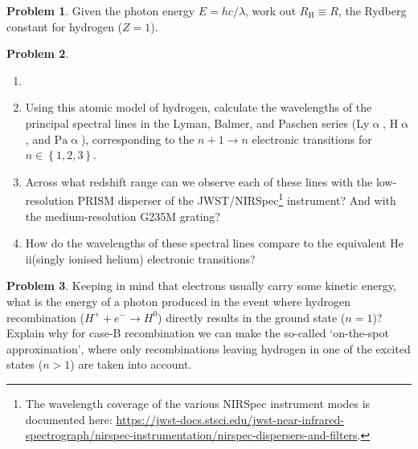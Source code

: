 \documentclass{article}
\newcommand{\Lya}{{Ly\ensuremath{\upalpha}}\xspace}
\newcommand{\HeII}{\hbox{He\,{\sc ii}}\xspace}
\newcommand{\Halpha}{\ensuremath{\mathrm{H}\upalpha}\xspace}
\newcommand{\Paalpha}{\ensuremath{\mathrm{Pa}\upalpha}\xspace}
\theoremstyle{definition}
\newtheorem{problem}{Problem}[section]
\begin{document}
\begin{problem}
    Given the photon energy $E = hc/\lambda$, work out $R_\mathrm{H} \equiv R$, the Rydberg constant for hydrogen ($Z = 1$).
\end{problem}
\begin{problem}
    \label{prob:HI_wavelengths}
    \begin{enumerate}[label=(\alph*)]
        \item[]
        \item Using this atomic model of hydrogen, calculate the wavelengths of the principal spectral lines in the Lyman, Balmer, and Paschen series (\Lya, \Halpha, and \Paalpha), corresponding to the $n+1 \rightarrow n$ electronic transitions for $n \in \left\{ 1, 2, 3 \right\}$.
        \item Across what redshift range can we observe each of these lines with the low-resolution PRISM disperser of the JWST/NIRSpec\footnote{The wavelength coverage of the various NIRSpec instrument modes is documented here: \url{https://jwst-docs.stsci.edu/jwst-near-infrared-spectrograph/nirspec-instrumentation/nirspec-dispersers-and-filters}.} instrument? And with the medium-resolution G235M grating?
        \item How do the wavelengths of these spectral lines compare to the equivalent \HeII (singly ionised helium) electronic transitions?
    \end{enumerate}
\end{problem}
\begin{problem}
    Keeping in mind that electrons usually carry some kinetic energy, what is the energy of a photon produced in the event where hydrogen recombination ($H^+ + e^- \rightarrow H^0$) directly results in the ground state ($n = 1$)? Explain why for case-B recombination we can make the so-called `on-the-spot approximation', where only recombinations leaving hydrogen in one of the excited states ($n > 1$) are taken into account.
\end{problem}
\end{document}
